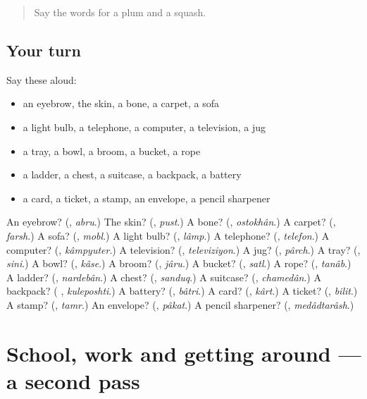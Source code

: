 \begin{quote}
Say the words for a plum and a squash.
\end{quote}

\subsection*{Your turn}
Say these aloud:

\begin{itemize}
\raggedright
  \item an eyebrow, the skin, a bone, a carpet, a sofa
  \item a light bulb, a telephone, a computer, a television, a jug
  \item a tray, a bowl, a broom, a bucket, a rope
  \item a ladder, a chest, a suitcase, a backpack, a battery
  \item a card, a ticket, a stamp, an envelope, a pencil sharpener
\end{itemize}

\begin{tcolorbox}[breakable,colback=teal!4,colframe=teal!35!black,title={Before you move on}]
An eyebrow? (\textbf{}, \emph{abru}.) The skin? (\textbf{}, \emph{pust}.) A bone? (\textbf{}, \emph{ostokhân}.) A carpet? (\textbf{}, \emph{farsh}.) A sofa? (\textbf{}, \emph{mobl}.) A light bulb? (\textbf{}, \emph{lâmp}.) A telephone? (\textbf{}, \emph{telefon}.) A computer? (\textbf{}, \emph{kâmpyuter}.) A television? (\textbf{}, \emph{televiziyon}.) A jug? (\textbf{}, \emph{pârch}.) A tray? (\textbf{}, \emph{sini}.) A bowl? (\textbf{}, \emph{kâse}.) A broom? (\textbf{}, \emph{jâru}.) A bucket? (\textbf{}, \emph{satl}.) A rope? (\textbf{}, \emph{tanâb}.) A ladder? (\textbf{}, \emph{nardebân}.) A chest? (\textbf{}, \emph{sanduq}.) A suitcase? (\textbf{}, \emph{chamedân}.) A backpack? (\textbf{ }, \emph{kuleposhti}.) A battery? (\textbf{}, \emph{bâtri}.) A card? (\textbf{}, \emph{kârt}.) A ticket? (\textbf{}, \emph{bilit}.) A stamp? (\textbf{}, \emph{tamr}.) An envelope? (\textbf{}, \emph{pâkat}.) A pencil sharpener? (\textbf{}, \emph{medâdtarâsh}.)
\end{tcolorbox}
\section[(dialogue)]{School, work and getting around — a second pass}

